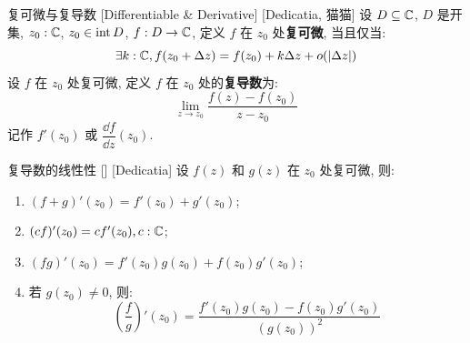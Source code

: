 


        \begin{dfn}
            {复可微与复导数}
            [Differentiable \& Derivative]
            [Dedicatia, 猫猫]
            设 \(D\subseteq\operatorname{\mathbb{C}}\), \(D\) 是开集, \(z_0:\operatorname{\mathbb{C}}\), \(z_0\in\operatorname{int} D\), \(f:D\to\operatorname{\mathbb{C}}\), 定义 \(f\) 在 \(z_0\) 处\textbf{复可微}, 当且仅当: 
            \[\exists k:\operatorname{\mathbb{C}}, f(z_0+\Delta z)=f(z_0)+k\Delta z+o(|\Delta z|)\]
            \tcbline
            设 \(f\) 在 \(z_0\) 处复可微, 定义 \(f\) 在 \(z_0\) 处的\textbf{复导数}为: 
            \[\lim_{z\to z_0}\frac{f(z)-f(z_0)}{z-z_0}\]
            记作 \(f'(z_0)\) 或 \(\dfrac{\dd f}{\dd z}(z_0)\). 
        \end{dfn}
        
        \begin{ppt}
            {复导数的线性性}
            []
            [Dedicatia]
            设 \(f(z)\) 和 \(g(z)\) 在 \(z_0\) 处复可微, 则:
            \begin{enumerate}
                \item \((f+g)'(z_0)=f'(z_0)+g'(z_0)\);
                \item \((cf)'(z_0)=cf'(z_0), c:\operatorname{\mathbb{C}}\);
                \item \((fg)'(z_0)=f'(z_0)g(z_0)+f(z_0)g'(z_0)\);
                \item 若 \(g(z_0)\neq 0\), 则: 
                    \[\left(\frac{f}{g}\right)'(z_0)=\frac{f'(z_0)g(z_0)-f(z_0)g'(z_0)}{(g(z_0))^2}\]
            \end{enumerate}
        \end{ppt}
        

